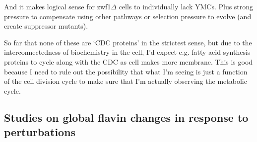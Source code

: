 And it makes logical sense for zwf1$\Delta{}$ cells to individually lack YMCs. Plus strong pressure to compensate using other pathways or selection pressure to evolve (and create suppressor mutants).

So far that none of these are `CDC proteins' in the strictest sense, but due to the interconnectedness of biochemistry in the cell, I'd expect e.g. fatty acid synthesis proteins to cycle along with the CDC as cell makes more membrane.
This is good because I need to rule out the possibility that what I'm seeing is just a function of the cell division cycle to make sure that I'm actually observing the metabolic cycle.

\subsection{Studies on global flavin changes in response to perturbations}
\label{subsec:intro-flavin-perturbations}


